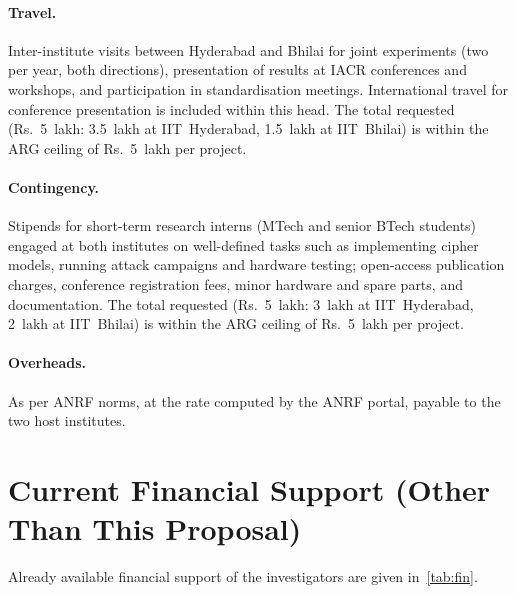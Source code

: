 \paragraph{Travel.}
Inter-institute visits between Hyderabad and Bhilai for joint experiments (two per year, both directions), presentation of results at IACR conferences and workshops, and participation in standardisation meetings.
International travel for conference presentation is included within this head.
The total requested (Rs.~5~lakh: 3.5~lakh at IIT~Hyderabad, 1.5~lakh at IIT~Bhilai) is within the ARG ceiling of Rs.~5~lakh per project.

\paragraph{Contingency.}
Stipends for short-term research interns (MTech and senior BTech students) engaged at both institutes on well-defined tasks such as implementing cipher models, running attack campaigns and hardware testing; open-access publication charges, conference registration fees, minor hardware and spare parts, and documentation.
The total requested (Rs.~5~lakh: 3~lakh at IIT~Hyderabad, 2~lakh at IIT~Bhilai) is within the ARG ceiling of Rs.~5~lakh per project.

\paragraph{Overheads.}
As per ANRF norms, at the rate computed by the ANRF portal, payable to the two host institutes.

\section{Current Financial Support (Other Than This Proposal)}
Already available financial support of the investigators are given in~\cref{tab:fin}.

